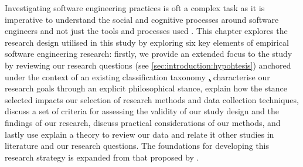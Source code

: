 \label{sec:research-strategy:preface}

Investigating software engineering practices is oft a complex task as it is imperative to understand the social and cognitive processes around software engineers and not just the tools and processes used \citep{Easterbrook:2007ws}. This chapter explores the research design utilised in this study by exploring six key elements of empirical software engineering research: firstly, we provide an extended focus to the study by reviewing our research questions (see \cref{sec:introduction:hypohtesis}) anchored under the context of an existing classification taxonomy \c, characterise our research goals through an explicit philosophical stance, explain how the stance selected impacts our selection of research methods and data collection techniques, discuss a set of criteria for assessing the validity of our study design and the findings of our research, discuss practical considerations of our methods, and lastly use explain a theory to review our data and relate it other studies in literature and our research questions. The foundations for developing this research strategy is expanded from that proposed by \citet{Easterbrook:2007ws}.